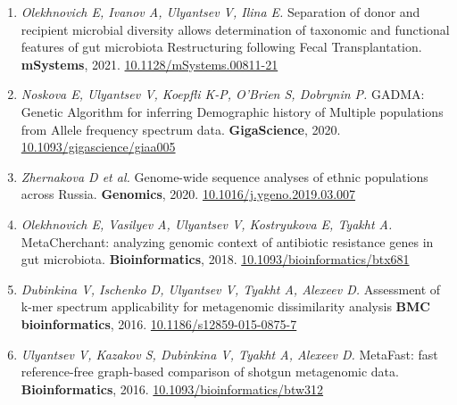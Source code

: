 \documentclass[11pt,a4paper,sans]{moderncv}        %
\newcommand{\doi}[1]{\href{http://doi.org/#1}{#1}}
\begin{document}
\begin{enumerate}
  \item\emph{Olekhnovich E, Ivanov A, Ulyantsev V, Ilina E.}
       Separation of donor and recipient microbial diversity allows determination of taxonomic and functional features of gut microbiota Restructuring following Fecal Transplantation.
       \textbf{mSystems}, 2021.
       \doi{10.1128/mSystems.00811-21}
  \item\emph{Noskova E, Ulyantsev V, Koepfli K-P, O’Brien S, Dobrynin P.}
       GADMA: Genetic Algorithm for inferring Demographic history of Multiple populations from Allele frequency spectrum data.
       \textbf{GigaScience}, 2020.
       \doi{10.1093/gigascience/giaa005}
  \item\emph{Zhernakova D et al.}
       Genome-wide sequence analyses of ethnic populations across Russia.
       \textbf{Genomics}, 2020.
       \doi{10.1016/j.ygeno.2019.03.007}
  \item\emph{Olekhnovich E, Vasilyev A, Ulyantsev V, Kostryukova E, Tyakht A.}
       MetaCherchant: analyzing genomic context of antibiotic resistance genes in gut microbiota.
       \textbf{Bioinformatics}, 2018.
       \doi{10.1093/bioinformatics/btx681}
  \item\emph{Dubinkina V, Ischenko D, Ulyantsev V, Tyakht A, Alexeev D.}
       Assessment of k-mer spectrum applicability for metagenomic dissimilarity analysis
       \textbf{BMC bioinformatics}, 2016.
       \doi{10.1186/s12859-015-0875-7}
  \item\emph{Ulyantsev V, Kazakov S, Dubinkina V, Tyakht A, Alexeev D.}
       MetaFast: fast reference-free graph-based comparison of shotgun metagenomic data.
       \textbf{Bioinformatics}, 2016.
       \doi{10.1093/bioinformatics/btw312}
\end{enumerate}
\end{document}
